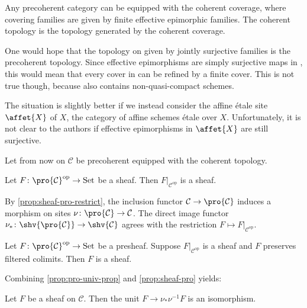 Any precoherent category can be equipped with the coherent coverage, where covering families are given by
finite effective epimorphic families. The coherent topology is the topology generated by the coherent coverage.

\begin{remark}
    One would hope that the topology on  given by jointly surjective families is the precoherent topology.
    Since effective epimorphisms are simply surjective maps in , this would mean that
    every cover in  can be refined by a finite cover. This is not true though, because
     also contains non-quasi-compact schemes.

    The situation is slightly better if we instead consider the affine étale site $\affet{X}$ of $X$, the
    category of affine schemes étale over $X$. Unfortunately, it is not clear to the authors if
    effective epimorphisms in $\affet{X}$ are still surjective.
    \label{remark:et-not-precoherent-topology}
\end{remark}

Let from now on $\mathcal{C}$ be precoherent equipped with the coherent topology.

\begin{proposition}
    Let $F \colon \pro{\mathcal{C}}^{\mathrm{op}} \to \mathrm{Set}$ be a sheaf. Then
    $F|_{\mathcal{C}^{\mathrm{op}}}$ is a sheaf.
    \label{prop:sheaf-pro-restrict}
\end{proposition}

By \ref{prop:sheaf-pro-restrict}, the inclusion functor $\mathcal{C} \to \pro{\mathcal{C}}$ induces a morphism on sites
$\nu\colon \pro{\mathcal{C}} \to \mathcal{C}$.
The direct image functor $\nu_{*}\colon \shv{\pro{\mathcal{C}}} \to \shv{\mathcal{C}}$ agrees with the
restriction $F \mapsto F|_{\mathcal{C}^{\mathrm{op}}}$.

\begin{proposition}
    Let $F \colon \pro{\mathcal{C}}^{\mathrm{op}} \to \mathrm{Set}$ be a presheaf. Suppose
    $F|_{\mathcal{C}^{\mathrm{op}}}$ is a sheaf and $F$ preserves filtered colimits. Then
    $F$ is a sheaf.
    \label{prop:sheaf-pro}
\end{proposition}

Combining \ref{prop:pro-univ-prop} and \ref{prop:sheaf-pro} yields:

\begin{corollary}
    Let $F$ be a sheaf on $\mathcal{C}$. Then the unit $F \to \nu_{*} \nu^{-1} F$ is an isomorphism.
    \label{cor:pro-direct-image-unit-iso}
\end{corollary}

